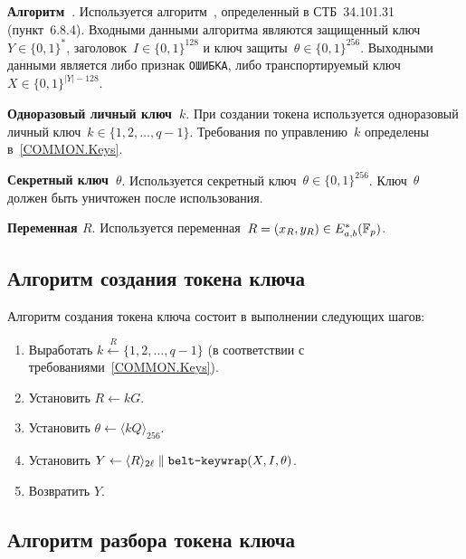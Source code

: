 {\bf Алгоритм~}.
Используется алгоритм~,
определенный в СТБ~34.101.31 (пункт~6.8.4).
Входными данными алгоритма являются
защищенный ключ~$Y\in\{0,1\}^*$,
заголовок~$I\in\{0,1\}^{128}$ 
и ключ защиты~$\theta\in\{0,1\}^{256}$.
%
Выходными данными является
либо признак \texttt{ОШИБКА}, 
либо транспортируемый ключ~$X\in\{0,1\}^{|Y|-128}$.

{\bf Одноразовый личный ключ~$k$}.
При создании токена используется одноразовый личный 
ключ~$k\in\{1,2,\ldots,q-1\}$.
Требования по управлению~$k$ определены в~\ref{COMMON.Keys}.

{\bf Секретный ключ~$\theta$}.
Используется секретный ключ~$\theta\in\{0,1\}^{256}$.
Ключ~$\theta$ должен быть уничтожен после использования.

{\bf Переменная $R$}.
Используется переменная~$R=(x_R,y_R)\in E_{a,b}^*(\mathbb{F}_p)$.

\subsection{Алгоритм создания токена ключа}\label{TRANSPORT.Wrap}

Алгоритм создания токена ключа состоит в выполнении следующих шагов:
\begin{enumerate}
\item
Выработать
$k\stackrel{R}{\leftarrow}\{1,2,\ldots,q-1\}$
(в соответствии с требованиями~\ref{COMMON.Keys}).

\item
Установить $R\leftarrow kG$.

\item
Установить $\theta\leftarrow\langle kQ\rangle_{256}$.

\item
Установить $Y\leftarrow \langle R\rangle_{2\ell}\parallel
\texttt{belt-keywrap}(X,I,\theta)$.

\item
Возвратить $Y$.
\end{enumerate}

\subsection{Алгоритм разбора токена ключа}\label{TRANSPORT.Unwrap}

